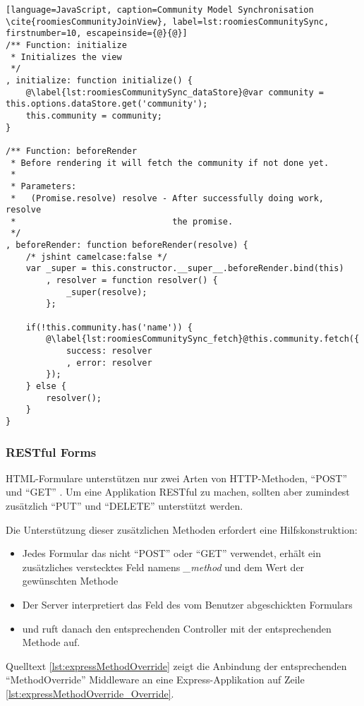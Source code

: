 \begin{lstlisting}[language=JavaScript, caption=Community Model Synchronisation \cite{roomiesCommunityJoinView}, label=lst:roomiesCommunitySync, firstnumber=10, escapeinside={@}{@}]
/** Function: initialize
 * Initializes the view
 */
, initialize: function initialize() {
	@\label{lst:roomiesCommunitySync_dataStore}@var community = this.options.dataStore.get('community');
	this.community = community;
}

/** Function: beforeRender
 * Before rendering it will fetch the community if not done yet.
 *
 * Parameters:
 *   (Promise.resolve) resolve - After successfully doing work, resolve
 *                               the promise.
 */
, beforeRender: function beforeRender(resolve) {
	/* jshint camelcase:false */
	var _super = this.constructor.__super__.beforeRender.bind(this)
		, resolver = function resolver() {
			_super(resolve);
		};

	if(!this.community.has('name')) {
		@\label{lst:roomiesCommunitySync_fetch}@this.community.fetch({
			success: resolver
			, error: resolver
		});
	} else {
		resolver();
	}
}
\end{lstlisting}

\subsubsection*{\gls{RESTful} Forms}
HTML-Formulare unterstützen nur zwei Arten von HTTP-Methoden, ``POST'' und ``GET'' \cite{FormMethodMDN}. Um eine Applikation \gls{RESTful} zu machen, sollten aber zumindest zusätzlich ``PUT'' und ``DELETE'' unterstützt werden.

Die Unterstützung dieser zusätzlichen Methoden erfordert eine Hilfskonstruktion:
\begin{itemize}
	\item Jedes Formular das nicht ``POST'' oder ``GET'' verwendet, erhält ein zusätzliches verstecktes Feld namens \emph{\_method} und dem Wert der gewünschten Methode
	\item Der Server interpretiert das Feld des vom Benutzer abgeschickten Formulars
	\item und ruft danach den entsprechenden Controller mit der entsprechenden Methode auf.
\end{itemize}

Quelltext \ref{lst:expressMethodOverride} zeigt die Anbindung der entsprechenden ``MethodOverride'' Middleware \cite{methodOverrideMiddleware} an eine Express-Applikation auf Zeile \ref{lst:expressMethodOverride_Override}.

